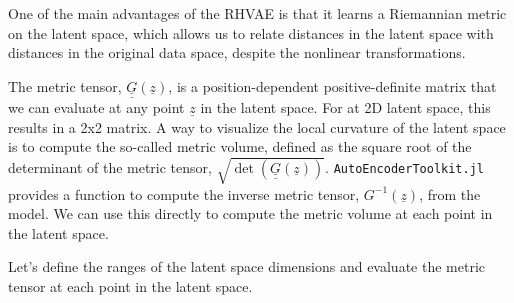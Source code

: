 \documentclass[
]{scrartcl}
\begin{document}
One of the main advantages of the RHVAE is that it learns a Riemannian
metric on the latent space, which allows us to relate distances in the
latent space with distances in the original data space, despite the
nonlinear transformations.

The metric tensor, \(\underline{\underline{G}}(\underline{z})\), is a
position-dependent positive-definite matrix that we can evaluate at any
point \(\underline{z}\) in the latent space. For at 2D latent space,
this results in a 2x2 matrix. A way to visualize the local curvature of
the latent space is to compute the so-called metric volume, defined as
the square root of the determinant of the metric tensor,
\(\sqrt{\det(\underline{\underline{G}}(\underline{z}))}\).
\texttt{AutoEncoderToolkit.jl} provides a function to compute the
inverse metric tensor, \(G^{-1}(\underline{z})\), from the model. We can
use this directly to compute the metric volume at each point in the
latent space.

Let's define the ranges of the latent space dimensions and evaluate the
metric tensor at each point in the latent space.
\end{document}
